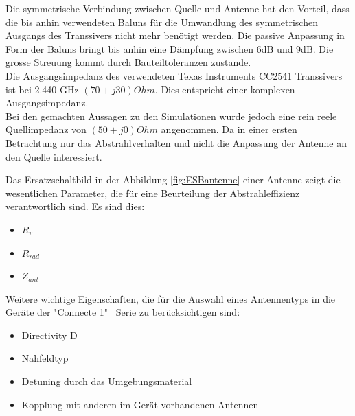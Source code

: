 Die symmetrische Verbindung zwischen Quelle und Antenne hat den Vorteil, dass die bis anhin verwendeten Baluns für die Umwandlung des symmetrischen Ausgangs des Transsivers nicht mehr benötigt werden. Die passive Anpassung in Form der Baluns bringt bis anhin eine Dämpfung zwischen 6dB und 9dB. Die grosse Streuung kommt durch Bauteiltoleranzen zustande.\\
Die Ausgangsimpedanz des verwendeten Texas Instruments CC2541 Transsivers ist bei 2.440 GHz $(70+j30) Ohm$. Dies entspricht einer komplexen Ausgangsimpedanz. \\Bei den gemachten Aussagen zu den Simulationen wurde jedoch eine rein reele Quellimpedanz von $(50+j0) Ohm$ angenommen. Da in einer ersten Betrachtung nur das Abstrahlverhalten und nicht die Anpassung der Antenne an den Quelle interessiert. 


Das Ersatzschaltbild in der Abbildung \ref{fig:ESBantenne} einer Antenne zeigt die wesentlichen Parameter, die für eine Beurteilung der Abstrahleffizienz verantwortlich sind. Es sind dies:
\begin{itemize}
\item $R_{v}$
\item $R_{rad}$
\item $Z_{ant}$
\end{itemize}

Weitere wichtige Eigenschaften, die für die Auswahl eines Antennentyps in die Geräte der "Connecte 1" \  Serie zu berücksichtigen  sind:
\begin{itemize}
\item Directivity D
\item Nahfeldtyp
\item Detuning durch das Umgebungsmaterial
\item Kopplung mit anderen im Gerät vorhandenen Antennen
\end{itemize}

